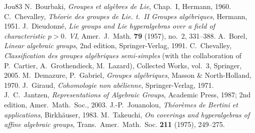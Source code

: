 \begin{thebibliography}{Jou83}
 N.~Bourbaki, \textit{Groupes et algèbres de Lie}, Chap.~I, Hermann, 1960.
 C.~Chevalley, \textit{Théorie des groupes de Lie. t.~II Groupes algébriques}, Hermann, 1951.
 J.~Dieudonné, \textit{Lie groups and Lie hyperalgebras over a field of characteristic $p>0$. VI}, Amer.~J.~Math. \textbf{79} (1957), no.~2, 331--388.
 A.~Borel, \textit{Linear algebraic groups}, 2nd edition, Springer-Verlag, 1991.
 C.~Chevalley, \textit{Classification des groupes algébriques semi-simples} (with the collaboration of P.~Cartier, A.~Grothendieck, M.~Lazard), Collected Works, vol.~3, Springer, 2005.
 M.~Demazure, P.~Gabriel, \textit{Groupes algébriques}, Masson \& North-Holland, 1970.
 J.~Giraud, \textit{Cohomologie non abélienne}, Springer-Verlag, 1971.
 J.~C.~Jantzen, \textit{Representations of Algebraic Groups}, Academic Press, 1987; 2nd edition, Amer.~Math.~Soc., 2003.
 J.-P.~Jouanolou, \textit{Théorèmes de Bertini et applications}, Birkhäuser, 1983.
 M.~Takeuchi, \textit{On coverings and hyperalgebras of affine algebraic groups}, Trans.~Amer.~Math.~Soc. \textbf{211} (1975), 249--275.
\end{thebibliography}
